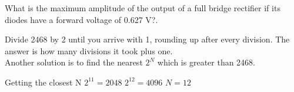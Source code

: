 	
		\question What is the maximum amplitude of the output of a full bridge rectifier if its diodes have a forward voltage of 0.627 V?.
		
		
		\begin{solution}
			Divide 2468 by 2 until you arrive with 1, rounding up after every division. The answer is how many divisions it took plus one. \\
			Another solution is to find the nearest $2^{N}$ which is greater than 2468.
			\begin{center}
			\end{center}
			
			Getting the closest N
			$2^{11} = 2048$
			$2^{12} = 4096$
			$N = 12$
		\end{solution}
	
		